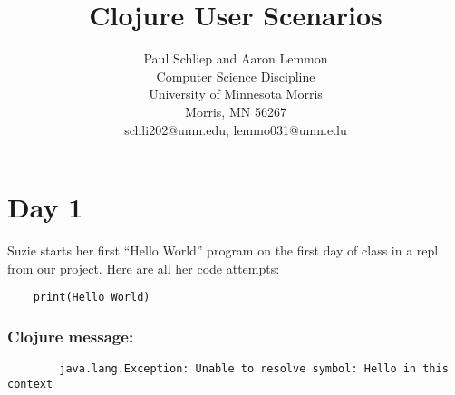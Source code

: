 \documentclass[12pt]{article}
\newcommand{\comment}[1]{}
\begin{document}
\pagestyle{plain}
%

\title{Clojure User Scenarios}
%
%

\author{
Paul Schliep and Aaron Lemmon \\
Computer Science Discipline \\
University of Minnesota Morris\\
Morris, MN 56267\\
schli202@umn.edu, lemmo031@umn.edu
}

\date{}

\maketitle
\thispagestyle{empty}




\newpage
\setcounter{page}{1}

\section{Day 1}
Suzie starts her first “Hello World” program on the first day of class in a repl from our project. Here are all her code attempts:

\begin{verbatim}
	print(Hello World)
\end{verbatim}
\subsubsection*{Clojure message:}
\begin{verbatim}
		java.lang.Exception: Unable to resolve symbol: Hello in this context
\end{verbatim}
\end{document}
